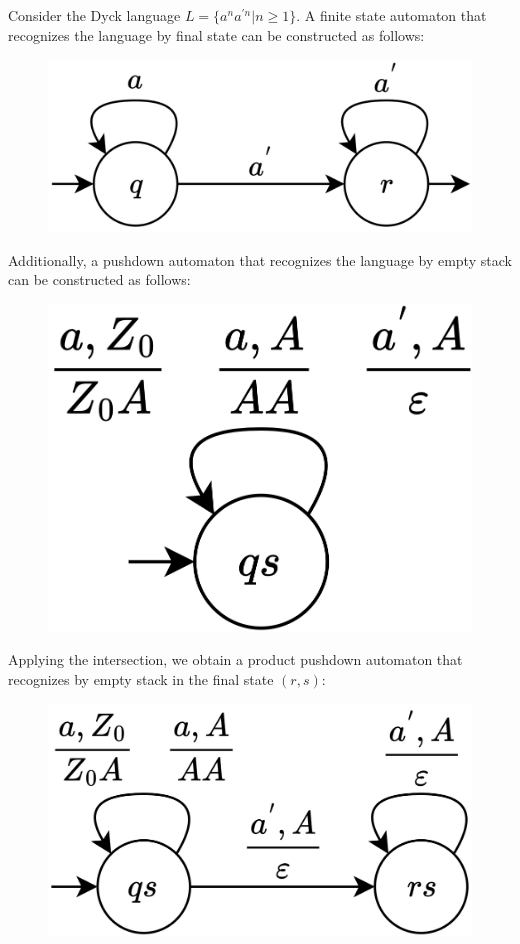 \begin{example}
    Consider the Dyck language $L=\{a^na^{'n}| n \geq 1\}$. 
    A finite state automaton that recognizes the language by final state can be constructed as follows:
    \begin{figure}[H]
        \centering
        \includegraphics[width=0.3\linewidth]{images/pdaint.png}
    \end{figure}
    Additionally, a pushdown automaton that recognizes the language by empty stack can be constructed as follows:
    \begin{figure}[H]
        \centering
        \includegraphics[width=0.25\linewidth]{images/pdaint1.png}
    \end{figure}
    Applying the intersection, we obtain a product pushdown automaton that recognizes by empty stack in the final state $(r,s)$: 
    \begin{figure}[H]
        \centering
        \includegraphics[width=0.3\linewidth]{images/pdaint2.png}
    \end{figure}
\end{example}